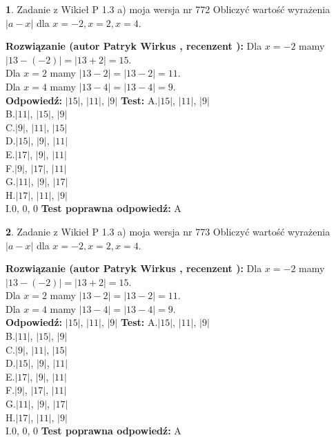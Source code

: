 \documentclass[12pt, a4paper]{article}
\theoremstyle{definition} %
\newtheorem{zad}{}
\newcommand{\zadStart}[1]{\begin{zad}#1\newline}
\newcommand{\zadStop}{\end{zad}}
\newcommand{\rozwStart}[2]{\noindent \textbf{Rozwiązanie (autor #1 , recenzent #2): }\newline}
\newcommand{\rozwStop}{\newline}
\newcommand{\odpStart}{\noindent \textbf{Odpowiedź:}\newline}
\newcommand{\odpStop}{\newline}
\newcommand{\testStart}{\noindent \textbf{Test:}\newline}
\newcommand{\testStop}{\newline}
\newcommand{\kluczStart}{\noindent \textbf{Test poprawna odpowiedź:}\newline}
\newcommand{\kluczStop}{\newline}
\begin{document}
\zadStart{Zadanie z Wikieł P 1.3 a) moja wersja nr 772}
Obliczyć wartość wyrażenia $|a - x|$ dla $x=-2,x=2,x=4$.
\zadStop
\rozwStart{Patryk Wirkus}{}
Dla $x = -2$ mamy $|13 - (-2)| = |13 + 2| = 15$.\\
Dla $x = 2$ mamy $|13 - 2| = |13 - 2| = 11$.\\
Dla $x = 4$ mamy $|13 - 4| = |13 - 4| = 9$.\\
\rozwStop
\odpStart
$|15|$, $|11|$, $|9|$
\odpStop
\testStart
A.$|15|$, $|11|$, $|9|$\\
B.$|11|$, $|15|$, $|9|$\\
C.$|9|$, $|11|$, $|15|$\\
D.$|15|$, $|9|$, $|11|$\\
E.$|17|$, $|9|$, $|11|$\\
F.$|9|$, $|17|$, $|11|$\\
G.$|11|$, $|9|$, $|17|$\\
H.$|17|$, $|11|$, $|9|$\\
I.$0$, $0$, $0$
\testStop
\kluczStart
A
\kluczStop



\zadStart{Zadanie z Wikieł P 1.3 a) moja wersja nr 773}
Obliczyć wartość wyrażenia $|a - x|$ dla $x=-2,x=2,x=4$.
\zadStop
\rozwStart{Patryk Wirkus}{}
Dla $x = -2$ mamy $|13 - (-2)| = |13 + 2| = 15$.\\
Dla $x = 2$ mamy $|13 - 2| = |13 - 2| = 11$.\\
Dla $x = 4$ mamy $|13 - 4| = |13 - 4| = 9$.\\
\rozwStop
\odpStart
$|15|$, $|11|$, $|9|$
\odpStop
\testStart
A.$|15|$, $|11|$, $|9|$\\
B.$|11|$, $|15|$, $|9|$\\
C.$|9|$, $|11|$, $|15|$\\
D.$|15|$, $|9|$, $|11|$\\
E.$|17|$, $|9|$, $|11|$\\
F.$|9|$, $|17|$, $|11|$\\
G.$|11|$, $|9|$, $|17|$\\
H.$|17|$, $|11|$, $|9|$\\
I.$0$, $0$, $0$
\testStop
\kluczStart
A
\kluczStop
\end{document}
